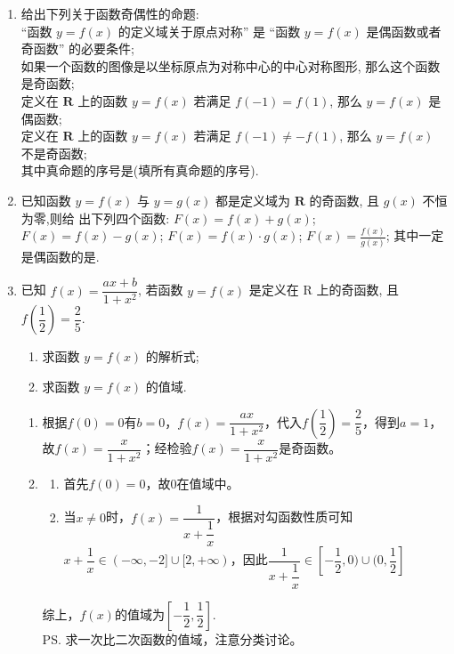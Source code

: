 \begin{enumerate}
\item 给出下列关于函数奇偶性的命题:\\
 “函数 $y=f(x)$ 的定义域关于原点对称” 是 “函数 $y=f(x)$ 是偶函数或者奇函数” 的必要条件;\\
 如果一个函数的图像是以坐标原点为对称中心的中心对称图形, 那么这个函数是奇函数;\\
 定义在 $\mathbf{R}$ 上的函数 $y=f(x)$ 若满足 $f(-1)=f(1)$, 那么 $y=f(x)$ 是偶函数;\\
 定义在 $\mathbf{R}$ 上的函数 $y=f(x)$ 若满足 $f(-1) \neq-f(1)$, 那么 $y=f(x)$ 不是奇函数;\\
其中真命题的序号是(填所有真命题的序号).


\item 已知函数 $y=f(x)$ 与 $y=g(x)$ 都是定义域为 $\mathbf{R}$ 的奇函数, 且 $g(x)$ 不恒为零,则给 出下列四个函数:   $F(x)=f(x)+g(x)$;   $F(x)=f(x)-g(x)$;  $F(x)=f(x) \cdot g(x)$;   $F(x)=\frac{f(x)}{g(x)}$; 其中一定是偶函数的是.


\item 已知 $f(x)=\dfrac{a x+b}{1+x^2}$, 若函数 $y=f(x)$ 是定义在 R 上的奇函数, 且 $f\left(\dfrac{1}{2}\right)=\dfrac{2}{5}$.
\begin{enumerate}
    \item 求函数 $y=f(x)$ 的解析式;
    \item 求函数 $y=f(x)$ 的值域.
\end{enumerate}

\begin{jieda}
    \begin{enumerate}
        \item 根据$f(0) = 0$有$b = 0$，$f(x)=\dfrac{ax}{1+x^2}$，代入$f(\dfrac{1}{2}) = \dfrac{2}{5}$，得到$a = 1$，故$f(x)=\dfrac{x}{1+x^2}$；经检验$f(x)=\dfrac{x}{1+x^2}$是奇函数。
        \item \begin{enumerate}
            \item 首先$f(0) = 0$，故$0$在值域中。
            \item 当$x \neq 0$时，$f(x) = \dfrac{1}{x + \dfrac{1}{x}}$，根据对勾函数性质可知$x + \dfrac{1}{x} \in (-\infty, -2] \cup [2, +\infty)$，因此$\dfrac{1}{x + \dfrac{1}{x}} \in [-\dfrac{1}{2}, 0) \cup (0, \dfrac{1}{2}]$
        \end{enumerate}
        综上，$f(x)$的值域为$[-\dfrac{1}{2},\dfrac{1}{2}]$. \\
        \ps  求一次比二次函数的值域，注意分类讨论。
    \end{enumerate}
\end{jieda}
\begin{vspace_}
   \vsp[3] 
\end{vspace_}


\end{enumerate}
